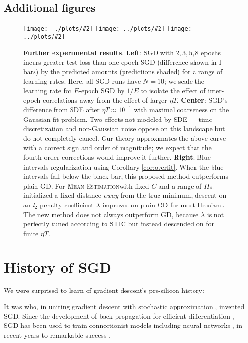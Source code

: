 \documentclass{article}
\theoremstyle{plain}
\theoremstyle{definition}
\newcommand{\pmoo}[2]{\texttt{[image: ../plots/\#2]}}
\newcommand{\MeanEstimation}{\textsc{Mean Estimation}}
\begin{document}
    \subsection{Additional figures}                                 \label{appendix:figures}
        \begin{figure}[H] 
            \centering
            \pmoo{3.0cm}{multi-fashion-logistic-0}
            \pmoo{3.0cm}{vs-sde}
            \pmoo{3.0cm}{tak-reg}
            \caption{
                \textbf{Further experimental results}.
                \textbf{Left}: SGD with $2, 3, 5, 8$ epochs incurs greater test
                loss than one-epoch SGD (difference shown in I bars) by the
                predicted amounts (predictions shaded) for a range of learning
                rates.  Here, all SGD runs have $N=10$; we scale the learning
                rate for $E$-epoch SGD by $1/E$ to isolate the effect of
                inter-epoch correlations away from the effect of larger $\eta
                T$.
                \textbf{Center}: SGD's difference from SDE after $\eta T
                \approx 10^{-1}$ with maximal coarseness on the Gaussian-fit
                problem.  Two effects not modeled by SDE ---
                time-discretization and non-Gaussian noise oppose on this
                landscape but do not completely cancel.  Our theory
                approximates the above curve with a correct sign and order of
                magnitude; we expect that the fourth order corrections would
                improve it further.
                \textbf{Right}: Blue intervals regularization using Corollary
                \ref{cor:overfit}.  When the blue intervals fall below the
                black bar, this proposed method outperforms plain GD.  For
                \MeanEstimation with fixed $C$ and a range of $H$s, initialized
                a fixed distance \emph{away} from the true minimum, descent on
                an $l_2$ penalty coefficient $\lambda$ improves on plain GD for
                most Hessians.  The new method does not always outperform GD,
                because $\lambda$ is not perfectly tuned according to STIC but
                instead descended on for finite $\eta T$.
            }
            \label{fig:takreg}
        \end{figure}


\section{History of SGD}
    We were surprised to learn of gradient descent's pre-silicon history:

    It was \cite{ki52} who, in uniting gradient descent \citep{ca47} with
    stochastic approximation \citep{ro51}, invented SGD.  Since the development
    of back-propagation for efficient differentiation \citep{we74}, SGD has
    been used to train connectionist models including neural networks
    \citep{bo91}, in recent years to remarkable success \citep{le15}.
\end{document}
